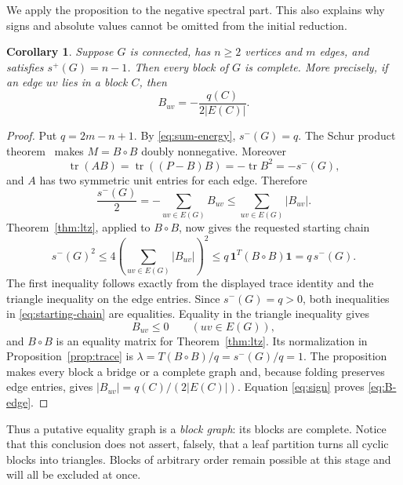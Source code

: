 \documentclass[11pt]{article}
\newtheorem{corollary}[theorem]{Corollary}
\theoremstyle{remark}
\newcommand{\one}{\mathbf 1}
\newcommand{\tr}{\operatorname{tr}}
\begin{document}
We apply the proposition to the negative spectral part.  This also explains
why signs and absolute values cannot be omitted from the initial reduction.

\begin{corollary}\label{cor:block-graph}
Suppose $G$ is connected, has $n\geq2$ vertices and $m$ edges, and satisfies
$s^+(G)=n-1$.  Then every block of $G$ is complete.  More precisely, if an
edge $uv$ lies in a block $C$, then
\begin{equation}\label{eq:B-edge}
 B_{uv}=-\frac{q(C)}{2|E(C)|}.
\end{equation}
\end{corollary}

\begin{proof}
Put $q=2m-n+1$.  By \eqref{eq:sum-energy}, $s^-(G)=q$.  The Schur product
theorem~\cite[Theorem~7.5.3]{HornJohnson} makes $M=B\circ B$ doubly
nonnegative.  Moreover
\[
 \tr(AB)=\tr((P-B)B)=-\tr B^2=-s^-(G),
\]
and $A$ has two symmetric unit entries for each edge.  Therefore
\[
 \frac{s^-(G)}2=-\sum_{uv\in E(G)}B_{uv}
 \leq\sum_{uv\in E(G)}|B_{uv}|.
\]
Theorem~\ref{thm:ltz}, applied to $B\circ B$, now gives the requested
starting chain
\begin{equation}\label{eq:starting-chain}
 s^-(G)^2
 \leq4\left(\sum_{uv\in E(G)}|B_{uv}|\right)^2
 \leq q\,\one^T(B\circ B)\one
 =q\,s^-(G).
\end{equation}
The first inequality follows exactly from the displayed trace identity and
the triangle inequality on the edge entries.  Since $s^-(G)=q>0$, both
inequalities in \eqref{eq:starting-chain} are equalities.  Equality in the
triangle inequality gives
\begin{equation}\label{eq:sign}
 B_{uv}\leq0\qquad(uv\in E(G)),
\end{equation}
and $B\circ B$ is an equality matrix for Theorem~\ref{thm:ltz}.  Its
normalization in Proposition~\ref{prop:trace} is
$\lambda=T(B\circ B)/q=s^-(G)/q=1$.  The proposition makes every block a
bridge or a complete graph and, because folding preserves edge entries,
gives $|B_{uv}|=q(C)/(2|E(C)|)$.  Equation \eqref{eq:sign} proves
\eqref{eq:B-edge}.
\end{proof}

Thus a putative equality graph is a \emph{block graph}: its blocks are
complete.  Notice that this conclusion does not assert, falsely, that a leaf
partition turns all cyclic blocks into triangles.  Blocks of arbitrary order
remain possible at this stage and will all be excluded at once.
\end{document}
